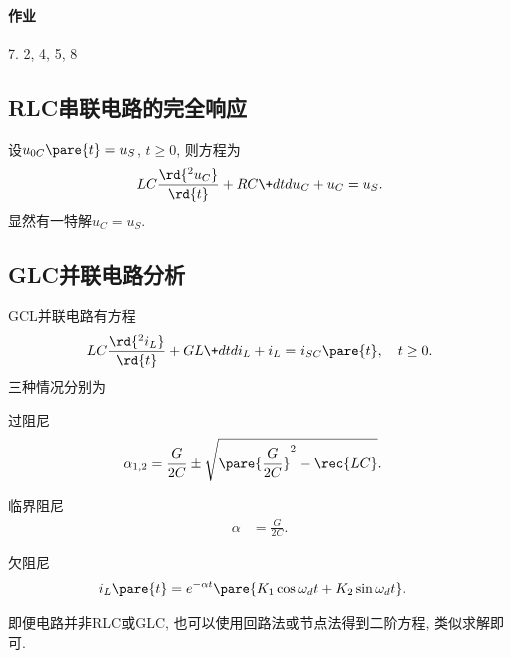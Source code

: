 \documentclass{ctexart}
\begin{document}
\paragraph{作业} %
\label{par:作业}

7. 2, 4, 5, 8


\subsection{RLC串联电路的完全响应} %
\label{sub:rlc串联电路的完全响应}

设$u_{0C}\pare{t} = u_S$, $t\ge 0$, 则方程为
\[ LC \frac{\rd{^2 u_C}}{\rd{t}} + RC \+dtd{u_C} + u_C = u_S. \]
显然有一特解$u_C = u_S$.


\subsection{GLC并联电路分析} %
\label{sub:glc并联电路分析}

GCL并联电路有方程
\[ LC\frac{\rd{^2 i_L}}{\rd{t}} + GL \+dtd{i_L} + i_L = i_{SC}\pare{t},\quad t\ge 0. \]
三种情况分别为
\begin{cenum}
    \item 过阻尼
    \begin{align*}
        \alpha_{1,2} &= \frac{G}{2C} \pm \sqrt{\pare{\frac{G}{2C}}^2 - \rec{LC}}.
    \end{align*}
    \item 临界阻尼
    \begin{align*}
        \alpha &= \frac{G}{2C}.
    \end{align*}
    \item 欠阻尼
    \begin{align*}
        i_L\pare{t} &= e^{-\alpha t}\pare{K_1 \cos \omega_d t + K_2 \sin \omega_d t}.
    \end{align*}
\end{cenum}
\begin{remark}
    即便电路并非RLC或GLC, 也可以使用回路法或节点法得到二阶方程, 类似求解即可.
\end{remark}


\end{document}
